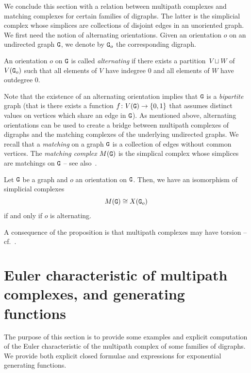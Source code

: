 \documentclass{amsart}
\begin{document}
We conclude this section with a relation between multipath complexes and matching complexes for certain families of digraphs. The latter is the simplicial complex whose simplices are collections of disjoint edges in an unoriented graph. We first need the notion of alternating orientations.
Given an orientation $o$ on an undirected graph ${\tt G}$, we denote by ${\tt G}_o$ the corresponding digraph. 

\begin{defn}
 An orientation $o$ on ${\tt G}$ is called \emph{alternating} if there exists a partition~$V\sqcup W$ of $V({\tt G}_o)$ such that all elements of  $V$ have indegree $0$ and all elements of $W$ have outdegree $0$.
\end{defn}

Note that the existence of an alternating orientation implies that ${\tt G}$ is a \emph{bipartite} graph (that is there exists a function $f\colon V({\tt G}) \to \{ 0,1\}$ that assumes distinct values on vertices which share an edge in ${\tt G}$).
As mentioned above, alternating orientations can be used to create a bridge between multipath complexes of digraphs and the matching complexes of the underlying undirected graphs. We recall that a \emph{matching} on a graph ${\tt G}$ is a collection of edges without common vertices. The \emph{matching complex} $M({\tt G})$ is the simplical complex whose simplices are matchings on ${\tt G}$ -- see also~\cite{torsion}. 

\begin{prop}
Let ${\tt G}$ be a graph and $o$ an orientation on ${\tt G}$. Then, we have an isomorphism of simplicial complexes \[M({\tt G}) \cong X({\tt G}_o)\] if and only if $o$ is alternating.
\end{prop}

A consequence of the proposition is that multipath complexes may have torsion -- cf.~\cite[Proposition~4.5]{SpriSecondo}.



\section{Euler characteristic of multipath complexes, and generating functions}\label{sec:generating}

The purpose of this section is to provide some examples and explicit computation of the Euler characteristic of the multipath complex of some families of  digraphs. We provide both explicit closed formulae and expressions for exponential generating functions.  
\end{document}
